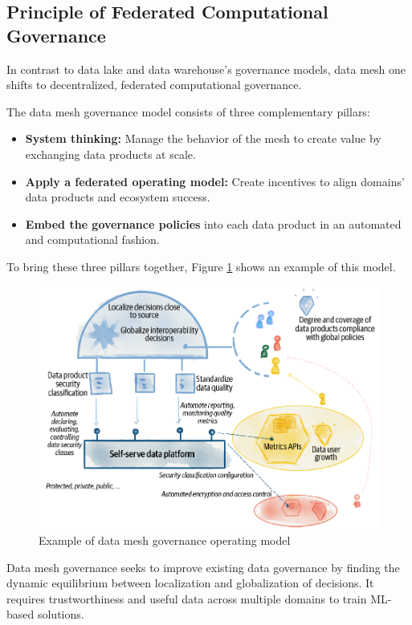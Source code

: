 \documentclass[12pt, a4paper]{book}
\begin{document}
\subsection{Principle of Federated Computational Governance}
In contrast to data lake and data warehouse's governance models, data mesh one shifts to decentralized, federated computational governance.

The data mesh governance model consists of three complementary pillars:
	\begin{itemize}[nosep]
		\item \textbf{System thinking:} Manage the behavior of the mesh to create value by exchanging data products at scale.
		\item \textbf{Apply a federated operating model:} Create incentives to align domains' data products and ecosystem success.
		\item \textbf{Embed the governance policies} into each data product in an automated and computational fashion. 
	\end{itemize}

To bring these three pillars together, Figure \ref{DataGov} shows an example of this model.

\begin{figure}[ht]
	\begin{framed}
		\centering
		\includegraphics[width=12cm]{DataGov.png}
		\caption{Example of data mesh governance operating model}
		\label{DataGov}
	\end{framed}
\end{figure}

Data mesh governance seeks to improve existing data governance by finding the dynamic equilibrium between localization and globalization of decisions. It requires trustworthiness and useful data across multiple domains to train ML-based solutions.
\end{document}
